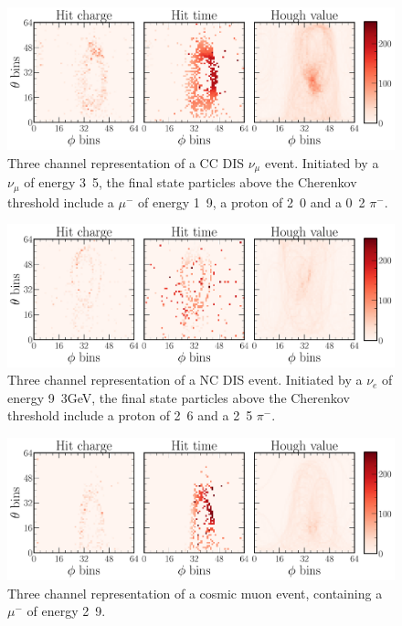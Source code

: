 \begin{figure} %
    \includegraphics[width=\textwidth]{diagrams/6-cvn/chipsnet/explore_numu_ccdis_event.pdf}
    \caption[Example of a CC DIS $\nu_{\mu}$ event.]
    {Three channel representation of a CC DIS $\nu_{\mu}$ event. Initiated by a $\nu_{\mu}$ of
        energy \unit{3.5}{\GeV}, the final state particles above the Cherenkov threshold include a
        $\mu^{-}$ of energy \unit{1.9}{\GeV}, a proton of \unit{2.0}{\GeV} and a \unit{0.2}{\GeV}
        $\pi^{-}$.}
    \label{fig:explore_numu_ccdis_event}
\end{figure}

\begin{figure} %
    \includegraphics[width=\textwidth]{diagrams/6-cvn/chipsnet/explore_nuel_ncdis_event.pdf}
    \caption[Example of a NC DIS event.]
    {Three channel representation of a NC DIS event. Initiated by a $\nu_{e}$ of energy
        \unit{9.3}{GeV}, the final state particles above the Cherenkov threshold include a proton
        of \unit{2.6}{\GeV} and a \unit{2.5}{\GeV} $\pi^{-}$.}
    \label{fig:explore_nuel_ncdis_event}
\end{figure}

\begin{figure} %
    \includegraphics[width=\textwidth]{diagrams/6-cvn/chipsnet/explore_cosmic_event.pdf}
    \caption[Example of a cosmic muon event.]
    {Three channel representation of a cosmic muon event, containing a $\mu^{-}$ of energy
        \unit{2.9}{\GeV}.}
    \label{fig:explore_cosmic_event}
\end{figure}

